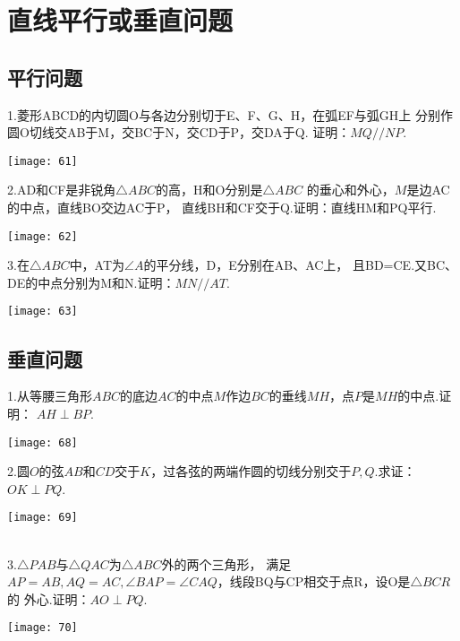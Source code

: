 \section{直线平行或垂直问题}
\subsection{平行问题}
1.菱形ABCD的内切圆O与各边分别切于E、F、G、H，在弧EF与弧GH上
分别作圆O切线交AB于M，交BC于N，交CD于P，交DA于Q.
证明：$MQ//NP$.
\begin{flushleft}
    \texttt{[image: 61]}
\end{flushleft}


2.AD和CF是非锐角$\bigtriangleup ABC$的高，H和O分别是$\bigtriangleup ABC$
的垂心和外心，$M$是边AC的中点，直线BO交边AC于P，
直线BH和CF交于Q.证明：直线HM和PQ平行.
\begin{flushleft}
    \texttt{[image: 62]}
\end{flushleft}

3.在$\bigtriangleup ABC$中，AT为$\angle A$的平分线，D，E分别在AB、AC上，
且BD=CE.又BC、DE的中点分别为M和N.证明：$MN//AT$.
\begin{flushleft}
    \texttt{[image: 63]}
\end{flushleft}

\newpage
\subsection{垂直问题}
1.从等腰三角形$ABC$的底边$AC$的中点$M$作边$BC$的垂线$MH$，点$P$是$MH$的中点.证明：
$AH\perp BP$.
\begin{flushleft}
    \texttt{[image: 68]}    
\end{flushleft}

2.圆$O$的弦$AB$和$CD$交于$K$，过各弦的两端作圆的切线分别交于$P,Q$.求证：
$OK\perp PQ$.
\begin{flushleft}
    \texttt{[image: 69]}    
\end{flushleft}
~\\

3.$\bigtriangleup PAB$与$\bigtriangleup QAC$为$\bigtriangleup ABC$外的两个三角形，
满足$AP=AB,AQ=AC,\angle BAP=\angle CAQ$，线段BQ与CP相交于点R，设O是$\bigtriangleup BCR$的
外心.证明：$AO\perp PQ$.
\begin{flushleft}
    \texttt{[image: 70]}    
\end{flushleft}



